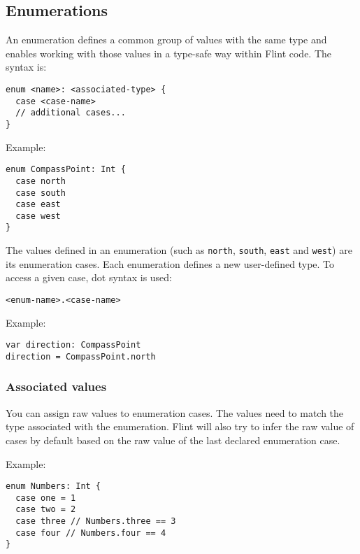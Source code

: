 \subsection{Enumerations}
\label{sec:appendix-b-enumerations}

An enumeration defines a common group of values with the same type and enables working with those values in a type-safe way within Flint code. The syntax is:

\begin{verbatim}
enum <name>: <associated-type> {
  case <case-name>
  // additional cases...
}
\end{verbatim}

Example:

\begin{verbatim}
enum CompassPoint: Int {
  case north
  case south
  case east
  case west
}
\end{verbatim}

The values defined in an enumeration (such as \texttt{north}, \texttt{south}, \texttt{east} and \texttt{west}) are its enumeration cases. Each enumeration defines a new user-defined type. To access a given case, dot syntax is used:

\begin{verbatim}
<enum-name>.<case-name>
\end{verbatim}

Example:

\begin{verbatim}
var direction: CompassPoint
direction = CompassPoint.north
\end{verbatim}

\subsubsection{Associated values}
\label{sec:appendix-b-associated-values}

You can assign raw values to enumeration cases. The values need to match the type associated with the enumeration. Flint will also try to infer the raw value of cases by default based on the raw value of the last declared enumeration case.

Example:

\begin{verbatim}
enum Numbers: Int {
  case one = 1
  case two = 2
  case three // Numbers.three == 3
  case four // Numbers.four == 4
}
\end{verbatim}

